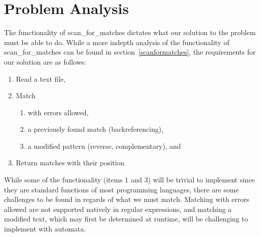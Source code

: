 \section{Problem Analysis}

The functionality of scan\_for\_matches dictates what our solution to the 
problem must be able to do. While a more indepth analysis of the functionality 
of scan\_for\_matches can be found in section~\ref{scanformatches}, 
the requirements for our solution are as follows:
\begin{enumerate}
\item Read a text file,
\item Match
\begin{enumerate}
\item with errors allowed,
\item a previously found match (backreferencing),
\item a modified pattern (reverse, complementary), and
\end{enumerate}
\item Return matches with their position
\end{enumerate}
While some of the functionality (items 1 and 3) will be trivial to implement 
since they are standard functions of most programming languages, there are 
some challenges to be found in regards of what we must match. Matching with 
errors allowed are not supported natively in regular expressions, and 
matching a modified text, which may first be determined at runtime, will be 
challenging to implement with automata.
